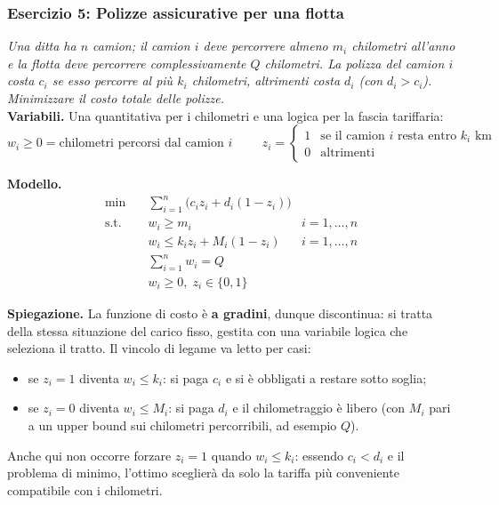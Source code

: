 \documentclass[12pt]{extarticle} %
\begin{document}
\subsubsection{Esercizio 5: Polizze assicurative per una flotta}
\textit{Una ditta ha $n$ camion; il camion $i$ deve percorrere almeno $m_i$ chilometri all'anno e la flotta deve percorrere complessivamente $Q$ chilometri. La polizza del camion $i$ costa $c_i$ se esso percorre al più $k_i$ chilometri, altrimenti costa $d_i$ (con $d_i > c_i$). Minimizzare il costo totale delle polizze.}\\

\noindent\textbf{Variabili.} Una quantitativa per i chilometri e una logica per la fascia tariffaria:
\[
w_i \ge 0 = \text{chilometri percorsi dal camion } i
\hspace{1cm}
z_i = \begin{cases} 1 & \text{se il camion } i \text{ resta entro } k_i \text{ km}\\ 0 & \text{altrimenti}\end{cases}
\]

\noindent\textbf{Modello.}
\[
\begin{aligned}
\min \quad & \sum_{i=1}^n \Big( c_i z_i + d_i (1-z_i) \Big) \\
\text{s.t.} \quad & w_i \ge m_i & i=1,\dots,n \\
& w_i \le k_i z_i + M_i (1-z_i) & i=1,\dots,n \\
& \sum_{i=1}^n w_i = Q \\
& w_i \ge 0, \; z_i \in \{0,1\}
\end{aligned}
\]

\noindent\textbf{Spiegazione.} La funzione di costo è \textbf{a gradini}, dunque discontinua: si tratta della stessa situazione del carico fisso, gestita con una variabile logica che seleziona il tratto. Il vincolo di legame va letto per casi:
\begin{itemize}
    \item se $z_i = 1$ diventa $w_i \le k_i$: si paga $c_i$ e si è obbligati a restare sotto soglia;
    \item se $z_i = 0$ diventa $w_i \le M_i$: si paga $d_i$ e il chilometraggio è libero (con $M_i$ pari a un upper bound sui chilometri percorribili, ad esempio $Q$).
\end{itemize}
Anche qui non occorre forzare $z_i=1$ quando $w_i \le k_i$: essendo $c_i < d_i$ e il problema di minimo, l'ottimo sceglierà da solo la tariffa più conveniente compatibile con i chilometri.
\end{document}
